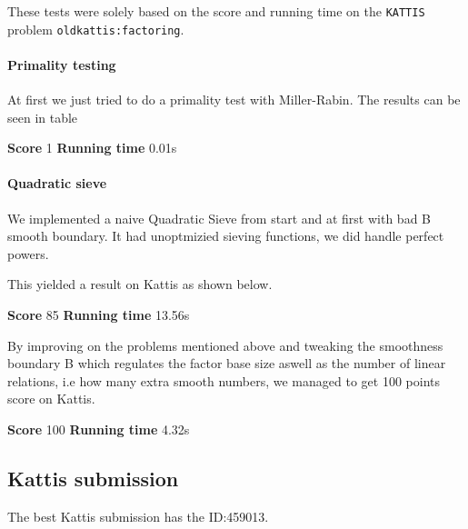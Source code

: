 These tests were solely based on the score and running time on the 
\texttt{KATTIS} problem \texttt{oldkattis:factoring}.

\paragraph{Primality testing}
At first we just tried to do a primality test with Miller-Rabin. 
The results can be seen in table

 \textbf{Score} 1   \textbf{Running time} 0.01s 
                          

\paragraph{Quadratic sieve}

We implemented a naive Quadratic Sieve from start and
at first with bad B smooth boundary. It had
unoptmizied sieving functions, we did handle perfect powers.

This yielded a result on Kattis as shown below.

 \textbf{Score} 85   \textbf{Running time} 13.56s 
                          

By improving on the problems mentioned above and tweaking the smoothness boundary
B which regulates the factor base size aswell as the number of linear relations,
i.e how many extra smooth numbers, we managed to get 100 points score on Kattis.

 \textbf{Score} 100   \textbf{Running time} 4.32s 

\subsection{Kattis submission}
The best Kattis submission has the ID:459013.